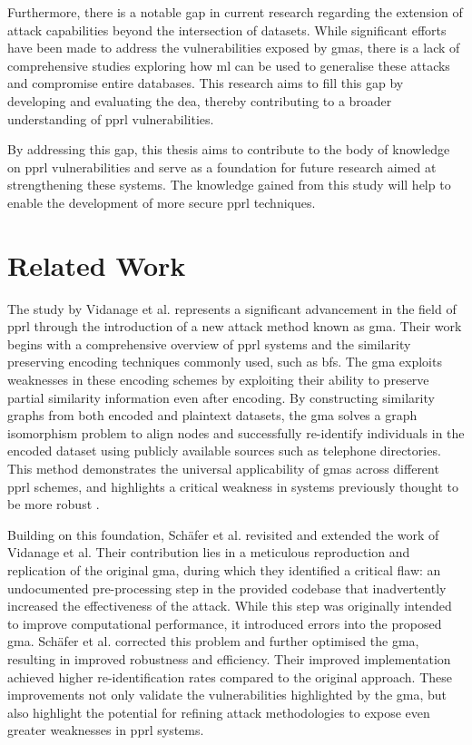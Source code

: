 Furthermore, there is a notable gap in current research regarding the extension of attack capabilities beyond the intersection of datasets.
While significant efforts have been made to address the vulnerabilities exposed by \ac{gma}s, there is a lack of comprehensive studies exploring how \ac{ml} can be used to generalise these attacks and compromise entire databases.
This research aims to fill this gap by developing and evaluating the \ac{dea}, thereby contributing to a broader understanding of \ac{pprl} vulnerabilities.

By addressing this gap, this thesis aims to contribute to the body of knowledge on \ac{pprl} vulnerabilities and serve as a foundation for future research aimed at strengthening these systems.
The knowledge gained from this study will help to enable the development of more secure \ac{pprl} techniques.

\section{Related Work}  \label{sec:rel-work}

The study by Vidanage et al. \cite{vidanage2020graph} represents a significant advancement in the field of \ac{pprl} through the introduction of a new attack method known as \ac{gma}.
Their work begins with a comprehensive overview of \ac{pprl} systems and the similarity preserving encoding techniques commonly used, such as \ac{bf}s.
The \ac{gma} exploits weaknesses in these encoding schemes by exploiting their ability to preserve partial similarity information even after encoding.
By constructing similarity graphs from both encoded and plaintext datasets, the \ac{gma} solves a graph isomorphism problem to align nodes and successfully re-identify individuals in the encoded dataset using publicly available sources such as telephone directories.
This method demonstrates the universal applicability of \ac{gma}s across different \ac{pprl} schemes, and highlights a critical weakness in systems previously thought to be more robust \cite{vidanage2020graph}.

Building on this foundation, Schäfer et al. \cite{schaefer2024} revisited and extended the work of Vidanage et al.
Their contribution lies in a meticulous reproduction and replication of the original \ac{gma}, during which they identified a critical flaw: an undocumented pre-processing step in the provided codebase that inadvertently increased the effectiveness of the attack.
While this step was originally intended to improve computational performance, it introduced errors into the proposed \ac{gma}.
Schäfer et al. \cite{schaefer2024} corrected this problem and further optimised the \ac{gma}, resulting in improved robustness and efficiency.
Their improved implementation achieved higher re-identification rates compared to the original approach.
These improvements not only validate the vulnerabilities highlighted by the \ac{gma}, but also highlight the potential for refining attack methodologies to expose even greater weaknesses in \ac{pprl} systems.

